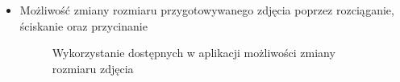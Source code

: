 \documentclass[polish,12pt]{aghthesis}
\begin{document}
\begin{itemize}
    \item Możliwość zmiany rozmiaru przygotowywanego zdjęcia poprzez rozciąganie, ściskanie oraz przycinanie
    \begin{figure}[H]
    \begin{adjustbox}{minipage=1.0\paperwidth, pagecenter}
    \centering
    \qquad
    \end{adjustbox}
    \end{figure}
    \begin{figure}[H]
    \ContinuedFloat
    \begin{adjustbox}{minipage=1.0\paperwidth, pagecenter}
    \centering
    \end{adjustbox}
    \caption{Wykorzystanie dostępnych w aplikacji możliwości zmiany rozmiaru zdjęcia}
    \end{figure}
    

\end{itemize}
\end{document}
